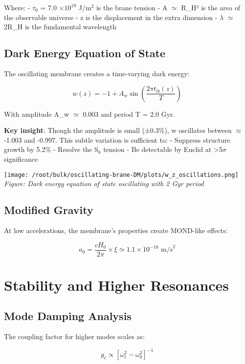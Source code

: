 \documentclass[
  11pt,
]{report}
\begin{document}
Where: - \(\tau_0\) = 7.0 \(\times 10^{19}\) J/m\(^2\) is the brane
tension - A \(\simeq\) R\_H² is the area of the observable universe - z
is the displacement in the extra dimension - \(\lambda\) \(\simeq\)
2R\_H is the fundamental wavelength

\subsection{Dark Energy Equation of
State}\label{dark-energy-equation-of-state}

The oscillating membrane creates a time-varying dark energy:

\[w(z) = -1 + A_w \sin\left(\frac{2\pi t_{lb}(z)}{T}\right)\]

With amplitude A\_w \(\simeq\) 0.003 and period T = 2.0 Gyr.

\textbf{Key insight}: Though the amplitude is small (±0.3\%), w
oscillates between \(\approx\) -1.003 and -0.997. This subtle variation
is sufficient to: - Suppress structure growth by 5.2\% - Resolve the
S\(_8\) tension - Be detectable by Euclid at \textgreater5\(\sigma\)
significance

\texttt{[image: /root/bulk/oscillating-brane-DM/plots/w\_z\_oscillations.png]}
\emph{Figure: Dark energy equation of state oscillating with 2 Gyr
period}

\subsection{Modified Gravity}\label{modified-gravity}

At low accelerations, the membrane's properties create MOND-like
effects:

\[a_0 = \frac{cH_0}{2\pi} × \xi \simeq 1.1 × 10^{-10} \text{ m/s}^2\]

\section{Stability and Higher
Resonances}\label{stability-and-higher-resonances}

\subsection{Mode Damping Analysis}\label{mode-damping-analysis}

The coupling factor for higher modes scales as:

\[g_{\ell} \propto [\omega_{\ell}^2 - \omega_0^2]^{-1}\]
\end{document}
